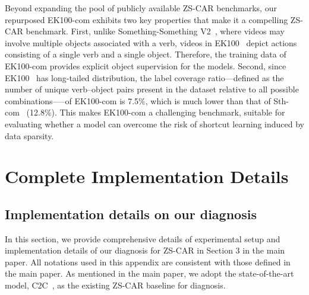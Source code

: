 Beyond expanding the pool of publicly available ZS-CAR benchmarks, our repurposed EK100-com exhibits two key properties that make it a compelling ZS-CAR benchmark.
First, unlike Something-Something V2~\cite{goyal2017something}, where videos may involve multiple objects associated with a verb, videos in EK100~\cite{damen2022ek100} depict actions consisting of a single verb and a single object. 
Therefore, the training data of EK100-com provides explicit object supervision for the models.
Second, since EK100~\cite{damen2022ek100} has long-tailed distribution, the label coverage ratio---defined as the number of unique verb--object pairs present in the dataset relative to all possible combinations—--of EK100-com is 7.5\%, which is much lower than that of Sth-com~\cite{li2024c2c} (12.8\%).
This makes EK100-com a challenging benchmark, suitable for evaluating whether a model can overcome the risk of shortcut learning induced by data sparsity.






\section{Complete Implementation Details}

\label{sec:imple_detail}

\subsection{Implementation details on our diagnosis}
In this section, we provide comprehensive details of experimental setup and implementation details of our diagnosis for ZS-CAR in Section 3 in the main paper.
All notations used in this appendix are consistent with those defined in the main paper.
As mentioned in the main paper, we adopt the state-of-the-art model, C2C~\cite{li2024c2c}, as the existing ZS-CAR baseline for diagnosis. 


